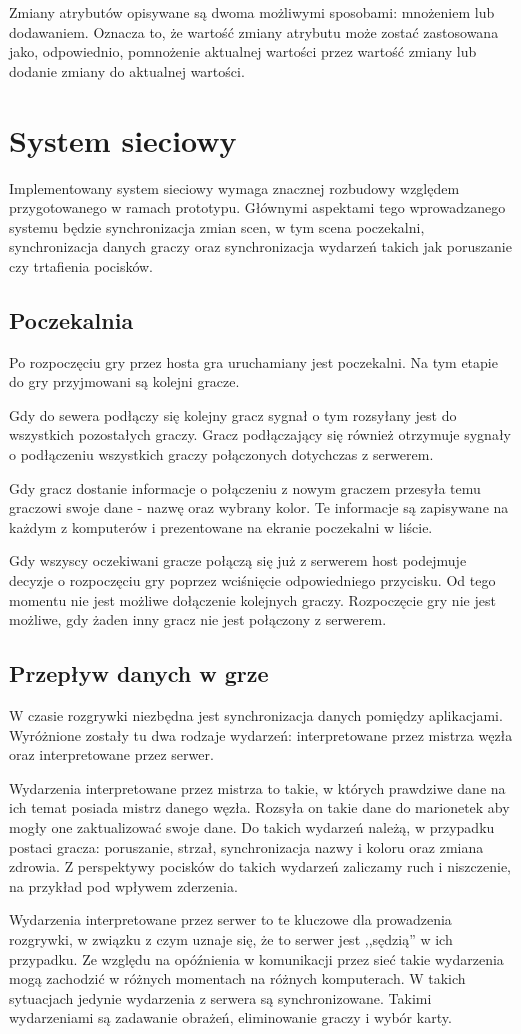 Zmiany atrybutów opisywane są dwoma możliwymi sposobami: mnożeniem lub dodawaniem. Oznacza to, że wartość zmiany atrybutu może zostać zastosowana jako, odpowiednio, pomnożenie aktualnej wartości przez wartość zmiany lub dodanie zmiany do aktualnej wartości. 

\section{System sieciowy}
Implementowany system sieciowy wymaga znacznej rozbudowy względem przygotowanego w ramach prototypu. Głównymi aspektami tego wprowadzanego systemu będzie synchronizacja zmian scen, w tym scena poczekalni, synchronizacja danych graczy oraz synchronizacja wydarzeń takich jak poruszanie czy trtafienia pocisków.

\subsection{Poczekalnia}
Po rozpoczęciu gry przez hosta gra uruchamiany jest poczekalni. Na tym etapie do gry przyjmowani są kolejni gracze.

Gdy do sewera podłączy się kolejny gracz sygnał o tym rozsyłany jest do wszystkich pozostałych graczy. Gracz podłączający się również otrzymuje sygnały o podłączeniu wszystkich graczy połączonych dotychczas z serwerem.

Gdy gracz dostanie informacje o połączeniu z nowym graczem przesyła temu graczowi swoje dane - nazwę oraz wybrany kolor. Te informacje są zapisywane na każdym z komputerów i prezentowane na ekranie poczekalni w liście.

Gdy wszyscy oczekiwani gracze połączą się już z serwerem host podejmuje decyzje o rozpoczęciu gry poprzez wciśnięcie odpowiedniego przycisku. Od tego momentu nie jest możliwe dołączenie kolejnych graczy. Rozpoczęcie gry nie jest możliwe, gdy żaden inny gracz nie jest połączony z serwerem.

\subsection{Przepływ danych w grze}
W czasie rozgrywki niezbędna jest synchronizacja danych pomiędzy aplikacjami. Wyróżnione zostały tu dwa rodzaje wydarzeń: interpretowane przez mistrza węzła oraz interpretowane przez serwer.

Wydarzenia interpretowane przez mistrza to takie, w których prawdziwe dane na ich temat posiada mistrz danego węzła. Rozsyła on takie dane do marionetek aby mogły one zaktualizować swoje dane. Do takich wydarzeń należą, w przypadku postaci gracza: poruszanie, strzał, synchronizacja nazwy i koloru oraz zmiana zdrowia. Z perspektywy pocisków do takich wydarzeń zaliczamy ruch i niszczenie, na przykład pod wpływem zderzenia.

Wydarzenia interpretowane przez serwer to te kluczowe dla prowadzenia rozgrywki, w związku z czym uznaje się, że to serwer jest ,,sędzią'' w ich przypadku. Ze względu na opóźnienia w komunikacji przez sieć takie wydarzenia mogą zachodzić w różnych momentach na różnych komputerach. W takich sytuacjach jedynie wydarzenia z serwera są synchronizowane. Takimi wydarzeniami są zadawanie obrażeń, eliminowanie graczy i wybór karty.